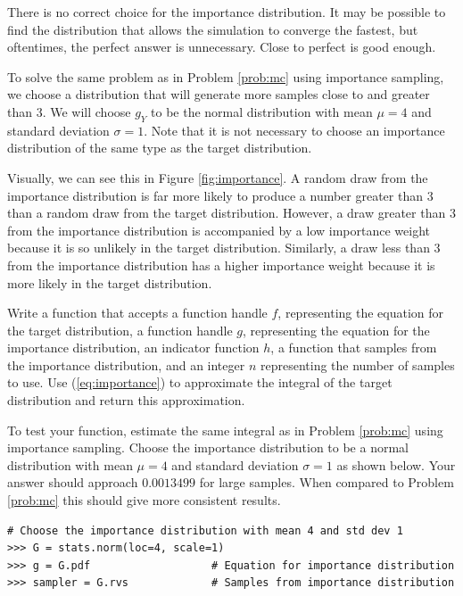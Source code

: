 There is no correct choice for the importance distribution.
It may be possible to find the distribution that allows the simulation to converge the fastest, but oftentimes, the perfect answer is unnecessary.
Close to perfect is good enough.

To solve the same problem as in Problem \ref{prob:mc} using importance sampling, we choose a distribution that will generate more samples close to and greater than 3.
We will choose $g_Y$ to be the normal distribution with mean $\mu = 4$ and standard deviation $\sigma = 1$.
Note that it is not necessary to choose an importance distribution of the same type as the target distribution.

Visually, we can see this in Figure \ref{fig:importance}.
A random draw from the importance distribution is far more likely to produce a number greater than 3 than a random draw from the target distribution.
However, a draw greater than 3 from the importance distribution is accompanied by a low importance weight because it is so unlikely in the target distribution.
Similarly, a draw less than 3 from the importance distribution has a higher importance weight because it is more likely in the target distribution.

\begin{problem} \label{prob:mc_important}
Write a function that accepts a function handle $f$, representing the equation for the target distribution, a function handle $g$, representing the equation for the importance distribution, an indicator function $h$, a function that samples from the importance distribution, and an integer $n$ representing the number of samples to use.
Use (\ref{eq:importance}) to approximate the integral of the target distribution and return this approximation.

To test your function, estimate the same integral as in Problem \ref{prob:mc} using importance sampling.
Choose the importance distribution to be a normal distribution with mean $\mu = 4$ and standard deviation $\sigma = 1$ as shown below.
Your answer should approach $0.0013499$ for large samples.
When compared to Problem \ref{prob:mc} this should give more consistent results.

\begin{lstlisting}
# Choose the importance distribution with mean 4 and std dev 1
>>> G = stats.norm(loc=4, scale=1)
>>> g = G.pdf                   # Equation for importance distribution
>>> sampler = G.rvs             # Samples from importance distribution
\end{lstlisting}

\end{problem}

